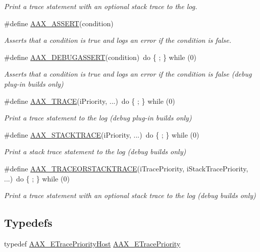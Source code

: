 \begin{DoxyCompactItemize}
\begin{DoxyCompactList}\small\item\em Print a trace statement with an optional stack trace to the log. \end{DoxyCompactList}\item 
\#define \mbox{\hyperlink{a00395_a168ee44fd7a5485ab50160db36fb2988}{A\+A\+X\+\_\+\+A\+S\+S\+E\+RT}}(condition)
\begin{DoxyCompactList}\small\item\em Asserts that a condition is true and logs an error if the condition is false. \end{DoxyCompactList}\item 
\#define \mbox{\hyperlink{a00395_aa0253bd2994036fcfd6629ecf465d543}{A\+A\+X\+\_\+\+D\+E\+B\+U\+G\+A\+S\+S\+E\+RT}}(condition)~do \{ ; \} while (0)
\begin{DoxyCompactList}\small\item\em Asserts that a condition is true and logs an error if the condition is false (debug plug-\/in builds only) \end{DoxyCompactList}\item 
\#define \mbox{\hyperlink{a00395_ab53f1d6a94f8b6ebb3a101f71bfe4e82}{A\+A\+X\+\_\+\+T\+R\+A\+CE}}(i\+Priority, ...)~do \{ ; \} while (0)
\begin{DoxyCompactList}\small\item\em Print a trace statement to the log (debug plug-\/in builds only) \end{DoxyCompactList}\item 
\#define \mbox{\hyperlink{a00395_ae871829dd7297e4a5ae6c7094f6b5398}{A\+A\+X\+\_\+\+S\+T\+A\+C\+K\+T\+R\+A\+CE}}(i\+Priority, ...)~do \{ ; \} while (0)
\begin{DoxyCompactList}\small\item\em Print a stack trace statement to the log (debug builds only) \end{DoxyCompactList}\item 
\#define \mbox{\hyperlink{a00395_a96862f9cb28b6a49eb5dbd6da9975ed1}{A\+A\+X\+\_\+\+T\+R\+A\+C\+E\+O\+R\+S\+T\+A\+C\+K\+T\+R\+A\+CE}}(i\+Trace\+Priority,  i\+Stack\+Trace\+Priority, ...)~do \{ ; \} while (0)
\begin{DoxyCompactList}\small\item\em Print a trace statement with an optional stack trace to the log (debug builds only) \end{DoxyCompactList}\end{DoxyCompactItemize}
\subsection*{Typedefs}
\begin{DoxyCompactItemize}
\item 
typedef \mbox{\hyperlink{a00491_a2dd667e4dea5781f38832fd9f1725f1b}{A\+A\+X\+\_\+\+E\+Trace\+Priority\+Host}} \mbox{\hyperlink{a00395_a28ae6ea1f243f005a891c5c77a5a5211}{A\+A\+X\+\_\+\+E\+Trace\+Priority}}
\end{DoxyCompactItemize}


